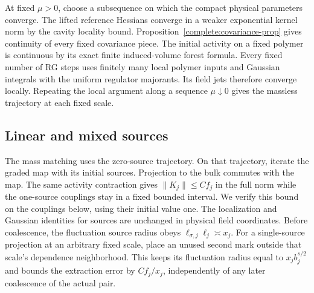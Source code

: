 \documentclass[11pt]{article}
\begin{document}
At fixed \(\mu>0\), choose a subsequence on which the compact physical
parameters converge. The lifted reference Hessians converge in a weaker
exponential kernel norm by the cavity locality bound. Proposition~\ref{complete:covariance-prop}
gives continuity of every fixed covariance piece. The initial activity
on a fixed polymer is continuous by its exact finite induced-volume
forest formula. Every fixed number of RG steps uses finitely many local
polymer inputs and Gaussian integrals with the uniform regulator
majorants. Its field jets therefore converge locally. Repeating the local argument along a sequence \(\mu\downarrow0\)
gives the massless trajectory at each fixed scale.

\subsection{Linear and mixed sources}
\label{frac:linear-mixed}
The mass matching uses the zero-source trajectory. On that trajectory,
iterate the graded map with its initial sources. Projection to the
bulk commutes with the map. The same activity contraction gives
\(\|K_j\|\le Cf_j\) in the full norm while the one-source couplings
stay in a fixed bounded interval. We verify this bound on the
couplings below, using their initial value one.
The localization and Gaussian identities for sources are unchanged
in physical field coordinates. Before coalescence, the fluctuation
source radius obeys \(\ell_{\sigma,j}\ell_j\asymp x_j\).
For a single-source projection at an arbitrary fixed scale, place an
unused second mark outside that scale's dependence neighborhood.
This keeps its fluctuation radius equal to \(x_jb_j^{s/2}\) and
bounds the extraction error by \(Cf_j/x_j\), independently of any
later coalescence of the actual pair.
\end{document}
